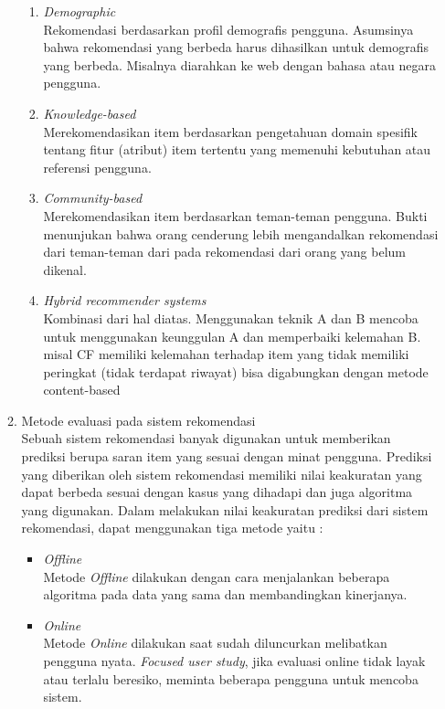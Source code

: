 \documentclass[a4paper,twoside]{article}
\begin{document}
\begin{enumerate}
\begin{enumerate}
\begin{enumerate}
					\item \textit{Demographic} \\
						Rekomendasi berdasarkan profil demografis pengguna. Asumsinya bahwa rekomendasi yang berbeda harus dihasilkan untuk demografis yang berbeda. Misalnya diarahkan ke web dengan bahasa atau negara pengguna. 

					\item \textit{Knowledge-based} \\
						Merekomendasikan item berdasarkan pengetahuan domain spesifik tentang fitur (atribut) item tertentu yang memenuhi kebutuhan atau referensi pengguna. 

					\item \textit{Community-based} \\
						Merekomendasikan item berdasarkan teman-teman pengguna. Bukti menunjukan bahwa orang cenderung lebih mengandalkan rekomendasi dari teman-teman dari pada rekomendasi dari orang yang belum dikenal. 

					\item \textit{Hybrid recommender systems} \\
						Kombinasi dari hal diatas. Menggunakan teknik A dan B mencoba untuk menggunakan keunggulan A dan memperbaiki kelemahan B. misal CF memiliki kelemahan terhadap item yang tidak memiliki peringkat (tidak terdapat riwayat)  bisa digabungkan dengan metode content-based
				\end{enumerate}
				
			\item Metode evaluasi pada sistem rekomendasi\\
			Sebuah sistem rekomendasi banyak digunakan untuk memberikan prediksi berupa saran item yang sesuai dengan minat pengguna. Prediksi yang diberikan oleh sistem rekomendasi memiliki nilai keakuratan yang dapat berbeda sesuai dengan kasus yang dihadapi dan juga algoritma yang digunakan. Dalam melakukan nilai keakuratan prediksi dari sistem rekomendasi, dapat menggunakan tiga metode yaitu :
				\begin{itemize}
					\item \textit{Offline}\\
						Metode \textit{Offline} dilakukan dengan cara menjalankan beberapa algoritma pada data yang sama dan membandingkan kinerjanya.
					\item \textit{Online}\\
						Metode \textit{Online} dilakukan saat sudah diluncurkan melibatkan pengguna nyata. \textit{Focused user study}, jika evaluasi online tidak layak atau terlalu beresiko, meminta beberapa pengguna untuk mencoba sistem.
				\end{itemize}
			

\end{enumerate}
\end{enumerate}
\end{document}
